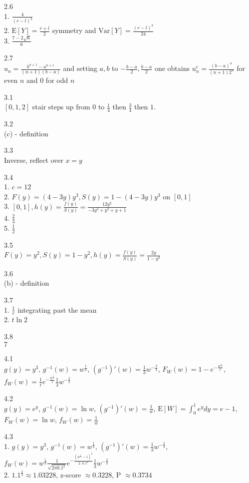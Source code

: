 2.6 \\
1. $\frac{4}{(r-l)^2}$\\
2. $\text{E}[Y]=\frac{r+l}{2}$ symmetry and $\text{Var}[Y]=\frac{(r-l)^2}{24}$\\
3. $\frac{7-2\sqrt{6}}{6}$

2.7 \\
$u_n=\frac{b^{n+1}-a^{n+1}}{(n+1)(b-a)}$ and setting $a,b$ to $-\frac{b-a}{2},\frac{b-a}{2}$ one obtains $u_n^c=\frac{(b-a)^n}{(n+1)2^n}$ for even $n$ and $0$ for odd $n$

\newpage

3.1 \\
$[0,1,2]$ stair steps up from $0$ to $\frac{1}{4}$ then $\frac{3}{4}$ then $1$.

3.2 \\
(c) - definition

3.3 \\
Inverse, reflect over $x=y$

3.4 \\
1. $c=12$\\
2. $F(y)=(4-3y)y^3, S(y)=1-(4-3y)y^3$ on $[0,1]$\\
3. $[0,1], h(y)=\frac{f(y)}{S(y)}=\frac{12y^2}{-3y^3+y^2+y+1}$\\
4. $\frac{2}{3}$\\
5. $\frac{1}{2}$

3.5 \\
$F(y)=y^2, S(y)=1-y^2, h(y)=\frac{f(y)}{S(y)}=\frac{2y}{1-y^2}$

3.6 \\
(b) - definition

3.7 \\
1. $\frac{1}{e}$ integrating past the mean\\
2. $t\ln{2}$

3.8 \\
$7$

\newpage

4.1 \\
$g(y)=y^3$, $g^{-1}(w)=w^{\frac{1}{3}}$, $(g^{-1})'(w)=\frac{1}{3}w^{-\frac{2}{3}}$, $F_W(w)=1-e^{-\frac{w^{\frac{1}{3}}}{t}}$, $f_W(w)=\frac{1}{t}e^{-\frac{w^{\frac{1}{3}}}{t}}\frac{1}{3}w^{-\frac{2}{3}}$

4.2 \\
$g(y)=e^y$, $g^{-1}(w)=\ln{w}$, $(g^{-1})'(w)=\frac{1}{w}$, $\text{E}[W]=\int_0^1 e^ydy=e-1$, $F_W(w)=\ln{w}$, $f_W(w)=\frac{1}{w}$

4.3 \\
1. $g(y)=y^3$, $g^{-1}(w)=w^{\frac{1}{3}}$, $(g^{-1})'(w)=\frac{1}{3}w^{-\frac{2}{3}}$, $f_W(w)=w^{\frac{1}{3}}\frac{1}{\sqrt{2\pi 0.1^2}}e^{-\frac{(w^{\frac{1}{3}}-1)^2}{2\cdot 0.1^2}} \frac{1}{3}w^{-\frac{2}{3}}$ \\
2. $1.1^{\frac{1}{3}}\approx 1.03228$, z-score $\approx 0.3228$, P $\approx 0.3734$

